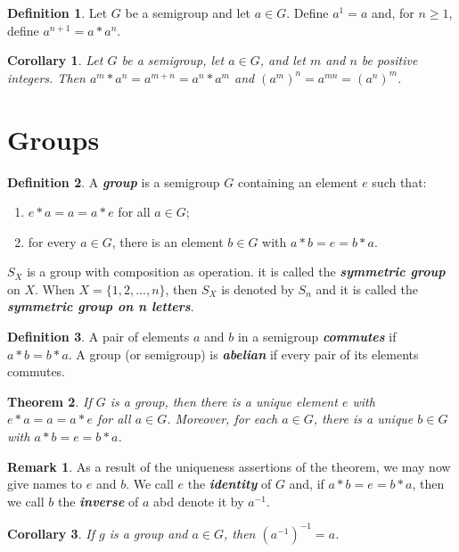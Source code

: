 \documentclass[12pt]{report}
\newtheorem{theorem}{Theorem}[chapter]
\newtheorem{corollary}[theorem]{Corollary}
\theoremstyle{definition}
\newtheorem*{definition}{Definition}
\newtheorem*{remark}{Remark}
\newcommand{\term}[1]{\textbf{\textit{#1}}}
\begin{document}
\begin{definition}
	Let $G$ be a semigroup and let $a\in G$. Define $a^1=a$ and, for $n\geq1$, define $a^{n+1}=a\ast a^n$.
\end{definition}

\begin{corollary}
	Let $G$ be a semigroup, let $a\in G$, and let $m$ and $n$ be positive integers. Then $a^m\ast a^n=a^{m+n}=a^n\ast a^m$ and $(a^m)^n=a^{mn}=(a^n)^m$.
\end{corollary}


\section{Groups}
\begin{definition}
	A \term{group} is a semigroup $G$ containing an element $e$ such that:
	\begin{enumerate}
		\item $e\ast a=a=a\ast e$ for all $a\in G$;
		\item for every $a\in G$, there is an element $b\in G$ with $a\ast b=e=b\ast a$.
	\end{enumerate}
	\par
	$S_X$ is a group with composition as operation. it is called the \term{symmetric group} on $X$. When $X=\{1, 2, \dots, n\}$,
	then $S_X$ is denoted by $S_n$ and it is called the \term{symmetric group on n letters}.
\end{definition}

\begin{definition}
	A pair of elements $a$ and $b$ in a semigroup \term{commutes} if $a\ast b=b\ast a$. A group (or semigroup) is \term{abelian} if every pair of its elements commutes.
\end{definition}

\begin{theorem}
	If $G$ is a group, then there is a unique element $e$ with $e\ast a=a=a\ast e$ for all $a\in G$.
	Moreover, for each $a\in G$, there is a unique $b\in G$ with $a\ast b=e=b\ast a$.
\end{theorem}

\begin{remark}
	As a result of the uniqueness assertions of the theorem, we may now give names to $e$ and $b$. We call $e$ the \term{identity} of $G$ and,
	if $a\ast b=e=b\ast a$, then we call $b$ the \term{inverse} of $a$ abd denote it by $a^{-1}$.
\end{remark}

\begin{corollary}
	If $g$ is a group and $a\in G$, then $(a^{-1})^{-1}=a$.
\end{corollary}
\end{document}
